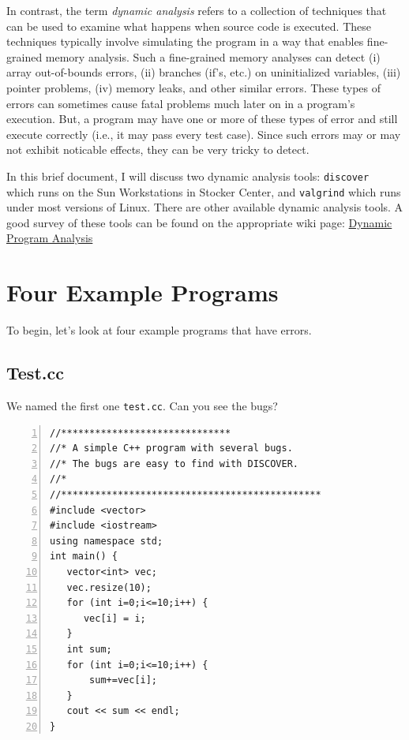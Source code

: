 \documentclass[12pt]{article}
\begin{document}
In contrast, the term \emph{dynamic analysis} refers to a collection
of techniques that can be used to examine what happens when source
code is executed.  These techniques typically involve simulating the
program in a way that enables fine-grained memory analysis.  Such a
fine-grained memory analyses can detect (i) array out-of-bounds
errors, (ii) branches (if's, etc.) on uninitialized variables, (iii)
pointer problems, (iv) memory leaks, and other similar errors.  
These types of errors can sometimes cause fatal problems 
much later on in a program's execution.  But, a program may have one or
more of these types of error and still execute correctly (i.e., it may pass
every test case).  Since such errors may or may not exhibit 
noticable effects, they can be very tricky to detect.  

In this brief document, I will discuss two dynamic analysis tools: {\tt discover
} which runs on the Sun Workstations in Stocker Center, and {\tt valgrind} which runs under most versions of Linux.  There are other available dynamic analysis tools.   A good survey of these tools can be found on the appropriate 
wiki page: \href{http://en.wikipedia.org/wiki/Dynamic_program_analysis}{Dynamic Program Analysis}
\vspace*{0.2 in}

\noindent {}
\vspace*{0.2 in}

\section{Four Example Programs}
To begin, let's look at four example programs that have errors.
\subsection{Test.cc}
We named the first one \verb+test.cc+.  Can you see the bugs?

\begin{Verbatim}[numbers=left,frame=single]
//******************************
//* A simple C++ program with several bugs.
//* The bugs are easy to find with DISCOVER.
//*
//********************************************** 
#include <vector>
#include <iostream>
using namespace std;
int main() {
   vector<int> vec;
   vec.resize(10);
   for (int i=0;i<=10;i++) {
      vec[i] = i;
   }
   int sum;
   for (int i=0;i<=10;i++) {
       sum+=vec[i];
   }
   cout << sum << endl;
}
\end{Verbatim}
\end{document}
